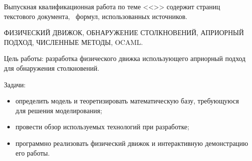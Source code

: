 
Выпускная квалификационная работа по теме <<\Topic>> содержит
\pageref{LastPage} страниц текстового документа,
\totalequations~формул,
 использованных источников.

\MakeUppercase{
    физический движок,
    обнаружение столкновений,
    априорный подход,
    численные методы,
    OCaml.
}

\newcommand\Target{разработка физического движка использующего априорный подход для обнаружения столкновений}
\newcommand\Tasks{\begin{itemize}
        \item определить модель и теоретизировать математическую базу, требующуюся для решения моделирования;
        \item провести обзор используемых технологий при разработке;
        \item программно реализовать физический движок и интерактивную демонстрацию его работы.
    \end{itemize}}

Цель работы: \Target.

Задачи:

\Tasks
